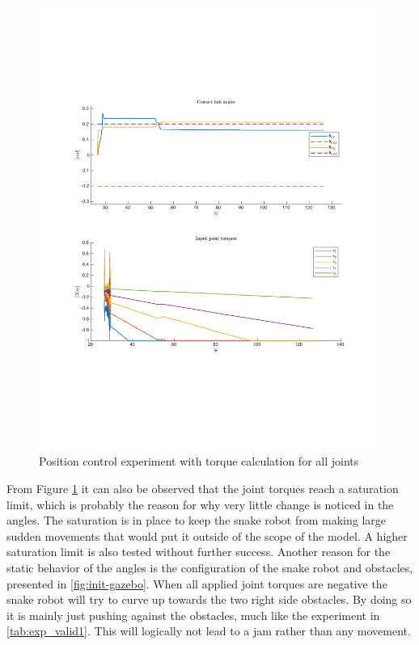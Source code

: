 \begin{figure}[H]
    \centering
    \includegraphics[trim=2.1cm 6cm 2.1cm 5cm, clip=true, width=\textwidth]{figures/experiments/2xpos/2xpos-2plot-fail.pdf}
    \caption{Position control experiment with torque calculation for all joints}
    \label{fig:2xp-1}
\end{figure}

From Figure \ref{fig:2xp-1} it can also be observed that the joint torques reach a saturation limit, which is probably the reason for why very little change is noticed in the angles. The saturation is in place to keep the snake robot from making large sudden movements that would put it outside of the scope of the model. A higher saturation limit is also tested without further success. Another reason for the static behavior of the angles is the configuration of the snake robot and obstacles, presented in \ref{fig:init-gazebo}. When all applied joint torques are negative the snake robot will try to curve up towards the two right side obstacles. By doing so it is mainly just pushing against the obstacles, much like the experiment in \ref{tab:exp_valid1}. This will logically not lead to a jam rather than any movement.

